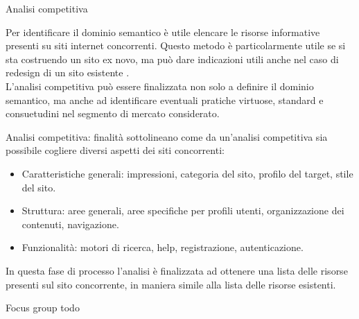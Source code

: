 \documentclass[pdf,mpa]{prosper}
\begin{document}
\begin{slide}{Analisi competitiva}

Per identificare il dominio semantico è utile elencare le risorse informative presenti su siti internet concorrenti. Questo metodo è particolarmente utile se si sta costruendo un sito ex novo, ma può dare indicazioni utili anche nel caso di redesign di un sito esistente \citep{Cordioli2006}.\\
L'analisi competitiva può essere finalizzata non solo a definire il dominio semantico, ma anche ad identificare eventuali pratiche virtuose, standard e consuetudini nel segmento di mercato considerato.
\end{slide}

\begin{slide}{Analisi competitiva: finalità}
\cite{CaprioGhiglione2003} sottolineano come da un'analisi competitiva sia possibile cogliere diversi aspetti dei siti concorrenti:
\begin{itemize}
\item Caratteristiche generali: impressioni, categoria del sito, profilo del target, stile del sito.
\item Struttura: aree generali, aree specifiche per profili utenti, organizzazione dei contenuti, navigazione.
\item Funzionalità: motori di ricerca, help, registrazione, autenticazione.
\end{itemize}
In questa fase di processo l'analisi è finalizzata ad ottenere una lista delle risorse presenti sul sito concorrente, in maniera simile alla lista delle risorse esistenti.
\end{slide}

\begin{slide}{Focus group}
todo
\end{slide}
\end{document}
